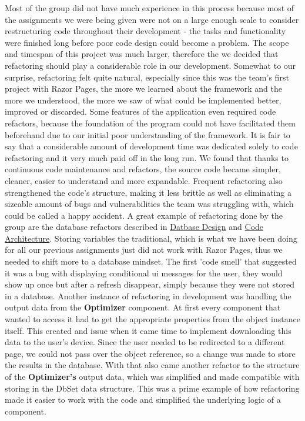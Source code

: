 \documentclass[12pt]{report}
\begin{document}
Most of the group did not have much experience in this process because most of the assignments we were being given
were not on a large enough scale to consider restructuring code throughout their development - the tasks and functionality
were finished long before poor code design could become a problem.
The scope and timespan of this project was much larger, therefore the we decided that refactoring should play a considerable
role in our development. Somewhat to our surprise, refactoring felt quite natural, especially since this was the team's first
project with Razor Pages, the more we learned about the framework and the more we understood, the more we saw of what 
could be implemented better, improved or discarded. Some features of the application even required code refactors, because the
foundation of the program could not have facilitated them beforehand due to our initial poor understanding of the framework.
It is fair to say that a considerable amount of development time was dedicated solely to code refactoring and it very much 
paid off in the long run. We found that thanks to continuous code maintenance and refactors, the source code became simpler, cleaner,
easier to understand and more expandable. Frequent refactoring also strengthened the code's structure, making it less brittle as well
as eliminating a sizeable amount of bugs and vulnerabilities the team was struggling with, which could be called a happy accident.
A great example of refactoring done by the group are the database refactors described in \hyperref[sec:database]{Datbase Design}
and \hyperref[sec:code]{Code Architecture}. Storing variables the traditional, which is what we have been doing for all our previous
assignments just did not work with Razor Pages, thus we needed to shift more to a database mindset. The first 'code smell' that suggested
it was a bug with displaying conditional ui messages for the user, they would show up once but after a refresh disappear, simply because
they were not stored in a database.
Another instance of refactoring in development was handling the output data from the \textbf{Optimizer} component. At first
every component that wanted to access it had to get the appropriate properties from the object instance itself. This created and issue
when it came time to implement downloading this data to the user's device. Since the user needed to be redirected to a different page,
we could not pass over the object reference, so a change was made to store the results in the database. With that also came another
refactor to the structure of the \textbf{Optimizer's} output data, which was simplified and made compatible with storing in the DbSet
data structure. This was a prime example of how refactoring made it easier to work with the code and simplified the underlying
logic of a component.
\end{document}
